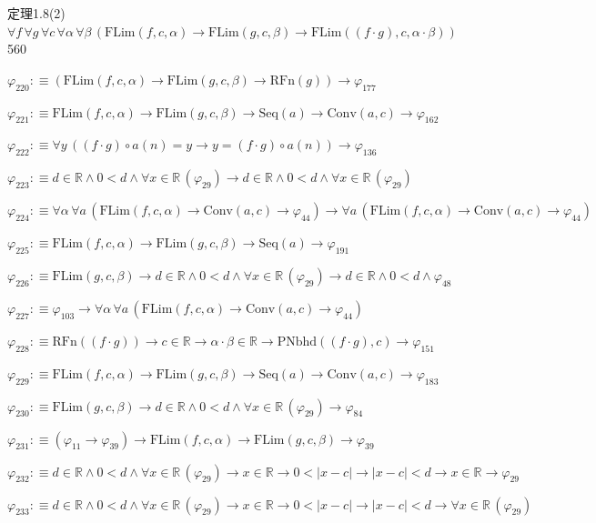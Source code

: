 \begin{fullproof}{定理1.8(2)}{$\forall f\,\forall g\,\forall c\,\forall \alpha\,\forall \beta\,(\mathrm{FLim}(f,c,\alpha) \to \mathrm{FLim}(g,c,\beta) \to \mathrm{FLim}((f \cdot g),c,\alpha \cdot \beta))$}{560}
\begin{abbrevlist}
\item $\varphi_{220} :\equiv (\mathrm{FLim}(f,c,\alpha) \to \mathrm{FLim}(g,c,\beta) \to \mathrm{RFn}(g)) \to \varphi_{177}$
\item $\varphi_{221} :\equiv \mathrm{FLim}(f,c,\alpha) \to \mathrm{FLim}(g,c,\beta) \to \mathrm{Seq}(a) \to \mathrm{Conv}(a,c) \to \varphi_{162}$
\item $\varphi_{222} :\equiv \forall y\,((f \cdot g) \circ a(n) = y \to y = (f \cdot g) \circ a(n)) \to \varphi_{136}$
\item $\varphi_{223} :\equiv d \in \mathbb{R} \land 0 < d \land \forall x \in \mathbb{R}\,(\varphi_{29}) \to d \in \mathbb{R} \land 0 < d \land \forall x \in \mathbb{R}\,(\varphi_{29})$
\item $\varphi_{224} :\equiv \forall \alpha\,\forall a\,(\mathrm{FLim}(f,c,\alpha) \to \mathrm{Conv}(a,c) \to \varphi_{44}) \to \forall a\,(\mathrm{FLim}(f,c,\alpha) \to \mathrm{Conv}(a,c) \to \varphi_{44})$
\item $\varphi_{225} :\equiv \mathrm{FLim}(f,c,\alpha) \to \mathrm{FLim}(g,c,\beta) \to \mathrm{Seq}(a) \to \varphi_{191}$
\item $\varphi_{226} :\equiv \mathrm{FLim}(g,c,\beta) \to d \in \mathbb{R} \land 0 < d \land \forall x \in \mathbb{R}\,(\varphi_{29}) \to d \in \mathbb{R} \land 0 < d \land \varphi_{48}$
\item $\varphi_{227} :\equiv \varphi_{103} \to \forall \alpha\,\forall a\,(\mathrm{FLim}(f,c,\alpha) \to \mathrm{Conv}(a,c) \to \varphi_{44})$
\item $\varphi_{228} :\equiv \mathrm{RFn}((f \cdot g)) \to c \in \mathbb{R} \to \alpha \cdot \beta \in \mathbb{R} \to \mathrm{PNbhd}((f \cdot g),c) \to \varphi_{151}$
\item $\varphi_{229} :\equiv \mathrm{FLim}(f,c,\alpha) \to \mathrm{FLim}(g,c,\beta) \to \mathrm{Seq}(a) \to \mathrm{Conv}(a,c) \to \varphi_{183}$
\item $\varphi_{230} :\equiv \mathrm{FLim}(g,c,\beta) \to d \in \mathbb{R} \land 0 < d \land \forall x \in \mathbb{R}\,(\varphi_{29}) \to \varphi_{84}$
\item $\varphi_{231} :\equiv (\varphi_{11} \to \varphi_{39}) \to \mathrm{FLim}(f,c,\alpha) \to \mathrm{FLim}(g,c,\beta) \to \varphi_{39}$
\item $\varphi_{232} :\equiv d \in \mathbb{R} \land 0 < d \land \forall x \in \mathbb{R}\,(\varphi_{29}) \to x \in \mathbb{R} \to 0 < \lvert x - c \rvert \to \lvert x - c \rvert < d \to x \in \mathbb{R} \to \varphi_{29}$
\item $\varphi_{233} :\equiv d \in \mathbb{R} \land 0 < d \land \forall x \in \mathbb{R}\,(\varphi_{29}) \to x \in \mathbb{R} \to 0 < \lvert x - c \rvert \to \lvert x - c \rvert < d \to \forall x \in \mathbb{R}\,(\varphi_{29})$

\end{abbrevlist}
\end{fullproof}
